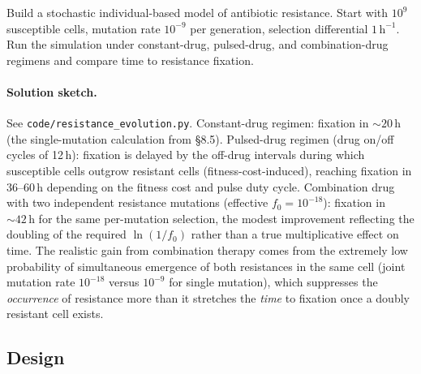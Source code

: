 \begin{exercise}
Build a stochastic individual-based model of antibiotic resistance.
Start with $10^9$ susceptible cells, mutation rate $10^{-9}$ per
generation, selection differential $1\,\text{h}^{-1}$. Run the
simulation under constant-drug, pulsed-drug, and combination-drug
regimens and compare time to resistance fixation.

\paragraph{Solution sketch.} See \texttt{code/resistance\_evolution.py}.
Constant-drug regimen: fixation in $\sim 20\,\text{h}$ (the
single-mutation calculation from §8.5). Pulsed-drug regimen (drug
on/off cycles of 12\,h): fixation is delayed by the off-drug
intervals during which susceptible cells outgrow resistant cells
(fitness-cost-induced), reaching fixation in 36--60\,h depending
on the fitness cost and pulse duty cycle. Combination drug with two
independent resistance mutations (effective $f_0 = 10^{-18}$):
fixation in $\sim 42\,\text{h}$ for the same per-mutation
selection, the modest improvement reflecting the doubling of the
required $\ln(1/f_0)$ rather than a true multiplicative effect on
time. The realistic gain from combination therapy comes from the
extremely low probability of simultaneous emergence of both
resistances in the same cell (joint mutation rate $10^{-18}$
versus $10^{-9}$ for single mutation), which suppresses the
\emph{occurrence} of resistance more than it stretches the
\emph{time} to fixation once a doubly resistant cell exists.
\end{exercise}

\subsection*{Design}

